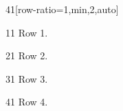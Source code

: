 \documentclass[paper=A4]{ropas-poster}
\begin{document}
\begin{postergrid}{4}{1}[row-ratio={1,min,2,auto}]
\begin{posterblock}{1}{1}
Row 1.
\end{posterblock}
\begin{posterblock}{2}{1}
Row 2.
\end{posterblock}
\begin{posterblock}{3}{1}
Row 3.
\end{posterblock}
\begin{posterblock}{4}{1}
Row 4.
\end{posterblock}
\end{postergrid}
\end{document}
